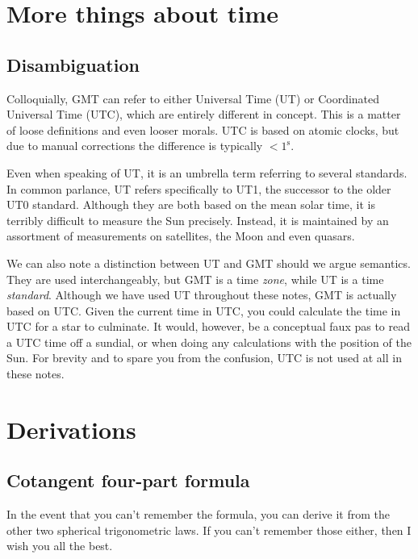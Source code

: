 \appendix

\section{More things about time}
\label{app:timesystems}

\subsection{Disambiguation}

Colloquially, GMT can refer to either Universal Time (UT) or Coordinated Universal Time (UTC), which are entirely different in concept. This is a matter of loose definitions and even looser morals. UTC is based on atomic clocks, but due to manual corrections the difference is typically $<1^\mathrm{s}$.

Even when speaking of UT, it is an umbrella term referring to several standards. In common parlance, UT refers specifically to UT1, the successor to the older UT0 standard. Although they are both based on the mean solar time, it is terribly difficult to measure the Sun precisely. Instead, it is maintained by an assortment of measurements on satellites, the Moon and even quasars.

We can also note a distinction between UT and GMT should we argue semantics. They are used interchangeably, but GMT is a time \textit{zone}, while UT is a time \textit{standard}. Although we have used UT throughout these notes, GMT is actually based on UTC. Given the current time in UTC, you could calculate the time in UTC for a star to culminate. It would, however, be a conceptual faux pas to read a UTC time off a sundial, or when doing any calculations with the position of the Sun. For brevity and to spare you from the confusion, UTC is not used at all in these notes. 

\section{Derivations}
\label{app:derivations}

\subsection{Cotangent four-part formula}
In the event that you can't remember the formula, you can derive it from the other two spherical trigonometric laws. If you can't remember those either, then I wish you all the best.

